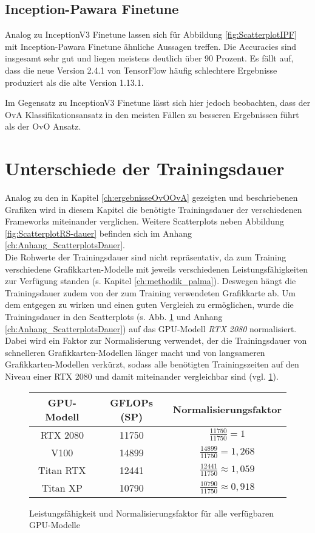 \subsection{Inception-Pawara Finetune}
Analog zu InceptionV3 Finetune lassen sich für Abbildung \ref{fig:ScatterplotIPF} mit Inception-Pawara Finetune ähnliche Aussagen treffen. Die Accuracies sind insgesamt sehr gut und liegen meistens deutlich über 90 Prozent.
Es fällt auf, dass die neue Version 2.4.1 von TensorFlow \cite{tensorflow} häufig schlechtere Ergebnisse produziert als die alte Version 1.13.1.

Im Gegensatz zu InceptionV3 Finetune lässt sich hier jedoch beobachten, dass der OvA Klassifikationsansatz in den meisten Fällen zu besseren Ergebnissen führt als der OvO Ansatz.




\section{Unterschiede der Trainingsdauer}
\label{ch:ergebnisseOvOOvA-Dauer}
Analog zu den in Kapitel \ref{ch:ergebnisseOvOOvA} gezeigten und beschriebenen Grafiken wird in diesem Kapitel die benötigte Trainingsdauer der verschiedenen Frameworks miteinander verglichen. Weitere Scatterplots neben Abbildung \ref{fig:ScatterplotRS-dauer} befinden sich im Anhang \ref{ch:Anhang_ScatterplotsDauer}.\\

Die Rohwerte der Trainingsdauer sind nicht repräsentativ, da zum Training verschiedene Grafikkarten-Modelle mit jeweils verschiedenen Leistungsfähigkeiten zur Verfügung standen (s. Kapitel \ref{ch:methodik_palma}). Deswegen hängt die Trainingsdauer zudem von der zum Training verwendeten Grafikkarte ab.
Um dem entgegen zu wirken und einen guten Vergleich zu ermöglichen, wurde die Trainingsdauer in den Scatterplots (s. Abb. \ref{ch:ergebnisseOvOOvA-Dauer} und Anhang \ref{ch:Anhang_ScatterplotsDauer}) auf das GPU-Modell \textit{RTX 2080} normalisiert. Dabei wird ein Faktor zur Normalisierung verwendet, der die Trainingsdauer von schnelleren Grafikkarten-Modellen länger macht und von langsameren Grafikkarten-Modellen verkürzt, sodass alle benötigten Trainingszeiten auf den Niveau einer RTX 2080 und damit miteinander vergleichbar sind (vgl. \ref{tab:GPUNormalisierung}).
\begin{figure}[H]
\begin{tabular}{|c|c|c|}
\hline 
GPU-Modell & GFLOPs (SP) & Normalisierungsfaktor\\
\hline 
RTX 2080 & 11750 & $\frac{11750}{11750}=1$ \\ 
\hline 
V100 & 14899 & $\frac{14899}{11750}=1,268$ \\ 
\hline 
Titan RTX & 12441 & $\frac{12441}{11750} \approx 1,059$ \\ 
\hline 
Titan XP & 10790 & $\frac{10790}{11750}\approx 0,918$ \\ 
\hline 
\end{tabular} 
\caption{Leistungsfähigkeit und Normalisierungsfaktor für alle verfügbaren GPU-Modelle \cite{palma2GPUs}}
\label{tab:GPUNormalisierung}
\end{figure}

